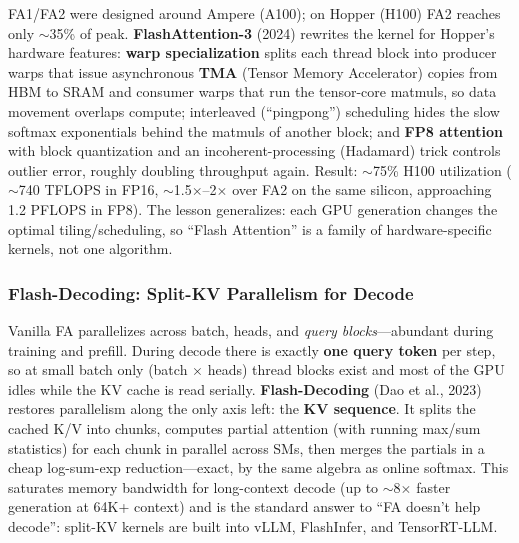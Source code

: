 FA1/FA2 were designed around Ampere (A100); on Hopper (H100) FA2 reaches only $\sim$35\% of peak. \textbf{FlashAttention-3} (2024) rewrites the kernel for Hopper's hardware features: \textbf{warp specialization} splits each thread block into producer warps that issue asynchronous \textbf{TMA} (Tensor Memory Accelerator) copies from HBM to SRAM and consumer warps that run the tensor-core matmuls, so data movement overlaps compute; interleaved (``pingpong'') scheduling hides the slow softmax exponentials behind the matmuls of another block; and \textbf{FP8 attention} with block quantization and an incoherent-processing (Hadamard) trick controls outlier error, roughly doubling throughput again. Result: $\sim$75\% H100 utilization ($\sim$740 TFLOPS in FP16, $\sim$1.5$\times$--2$\times$ over FA2 on the same silicon, approaching 1.2 PFLOPS in FP8). The lesson generalizes: each GPU generation changes the optimal tiling/scheduling, so ``Flash Attention'' is a family of hardware-specific kernels, not one algorithm.

\subsubsection{Flash-Decoding: Split-KV Parallelism for Decode}
\label{sec:flash_decoding}

Vanilla FA parallelizes across batch, heads, and \textit{query blocks}---abundant during training and prefill. During decode there is exactly \textbf{one query token} per step, so at small batch only (batch $\times$ heads) thread blocks exist and most of the GPU idles while the KV cache is read serially. \textbf{Flash-Decoding} (Dao et al., 2023) restores parallelism along the only axis left: the \textbf{KV sequence}. It splits the cached K/V into chunks, computes partial attention (with running max/sum statistics) for each chunk in parallel across SMs, then merges the partials in a cheap log-sum-exp reduction---exact, by the same algebra as online softmax. This saturates memory bandwidth for long-context decode (up to $\sim$8$\times$ faster generation at 64K+ context) and is the standard answer to ``FA doesn't help decode'': split-KV kernels are built into vLLM, FlashInfer, and TensorRT-LLM.

